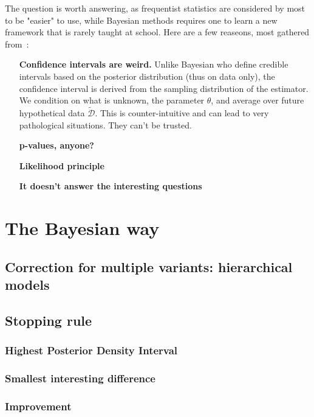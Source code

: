 \documentclass{tufte-book}
\begin{document}
The question is worth answering, as frequentist statistics are considered by most to be "easier" to use, while
Bayesian methods requires one to learn a new framework that is rarely taught at school. Here are a few
reaseons, most gathered from~\cite{Murphy2012}:


\begin{itemize}
  \item[\textbf{Confidence intervals are weird.}] Unlike Bayesian who define credible intervals based on the
    posterior distribution (thus on data only), the confidence interval is derived from the sampling
    distribution of the estimator. We condition on what is unknown, the parameter $\theta$, and average over
    future hypothetical data $\tilde{\mathcal{D}}$. This is counter-intuitive and can lead to very
    pathological situations. They can't be trusted.
  \item[\textbf{p-values, anyone?}]
  \item[\textbf{Likelihood principle}]
  \item[\textbf{It doesn't answer the interesting questions}]
\end{itemize}

\chapter{The Bayesian way}
\label{chap:Bayes}

\section{Correction for multiple variants: hierarchical models}

\section{Stopping rule}
\label{sec:Stopping rule}

\subsection{Highest Posterior Density Interval}

\subsection{Smallest interesting difference}

\subsection{Improvement}
\end{document}

